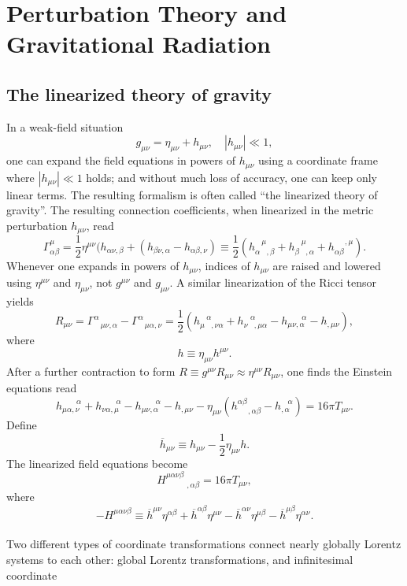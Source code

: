 \chapter{Perturbation Theory and Gravitational Radiation}
\section{The linearized theory of gravity}
In a weak-field situation
\[g_{\mu\nu} = \eta_{\mu\nu} + h_{\mu\nu} , \quad |h_{\mu\nu}| \ll 1 ,\]
one can expand the field equations in powers of $h_{\mu\nu}$ using a coordinate frame where $|h_{\mu\nu}| \ll 1$ holds; and without much loss of accuracy, one can keep only linear terms. The resulting formalism is often called ``the linearized theory of gravity''. The resulting connection coefficients, when linearized in the metric perturbation $h_{\mu\nu}$, read 
\[\Gamma^{\mu}_{\alpha \beta} = \frac{1}{2}\eta^{\mu\nu} (h_{\alpha\nu,\beta} + (h_{\beta\nu,\alpha} - h_{\alpha\beta,\nu}) \equiv \frac{1}{2}(h_{\alpha \phantom{*},\beta}^{\phantom{*} \mu} + h_{\beta \phantom{*},\alpha}^{\phantom{*} \mu} + h_{\alpha\beta}^{\phantom{**} ,\mu} ).\]
Whenever one expands in powers of $h_{\mu\nu}$, indices of $h_{\mu\nu}$ are raised and lowered using $\eta^{\mu\nu}$ and $\eta_{\mu\nu}$, not $g^{\mu\nu}$ and $g_{\mu\nu}$. A similar linearization of the Ricci tensor yields
\[R_{\mu\nu} = \Gamma^{\alpha}_{\phantom{*}\mu\nu,\alpha} - \Gamma^{\alpha}_{\phantom{*}\mu\alpha,\nu} = \frac{1}{2}(h_{\mu \phantom{*},\nu\alpha}^{\phantom{*} \alpha} + h_{\nu \phantom{*},\mu\alpha}^{\phantom{*} \alpha} - h_{\mu\nu,\alpha}^{\phantom{***}\alpha} - h_{,\mu\nu}),\]
where
\[h \equiv \eta_{\mu\nu}h^{\mu\nu}.\]
After a further contraction to form $R \equiv g^{\mu\nu}R_{\mu\nu} \approx \eta^{\mu\nu}R_{\mu\nu}$,
one finds the Einstein equations read
\[h_{\mu\alpha,\nu}^{\phantom{***}\alpha} + h_{\nu\alpha,\mu}^{\phantom{***}\alpha} - h_{\mu\nu,\alpha}^{\phantom{***}\alpha} - h_{,\mu\nu} - \eta_{\mu\nu}(h^{\alpha\beta}_{\phantom{**},\alpha\beta} - h_{,\alpha}^{\phantom{*}\alpha}) = 16\pi T_{\mu\nu}.\]
Define
\[\overline{h}_{\mu\nu} \equiv h_{\mu\nu} - \frac{1}{2}\eta_{\mu\nu}h.\]
The linearized field equations become
\[H^{\mu\alpha\nu\beta}_{\phantom{****},\alpha\beta} = 16\pi T_{\mu\nu},\]
where
\[-H^{\mu\alpha\nu\beta} \equiv \overline{h}^{\mu\nu}\eta^{\alpha\beta} + \overline{h}^{\alpha\beta}\eta^{\mu\nu} - \overline{h}^{\alpha\nu}\eta^{\mu\beta} - \overline{h}^{\mu\beta}\eta^{\alpha\nu} .\]
\\
Two different types of coordinate transformations connect nearly globally Lorentz systems to each other: global Lorentz transformations, and infinitesimal coordinate
